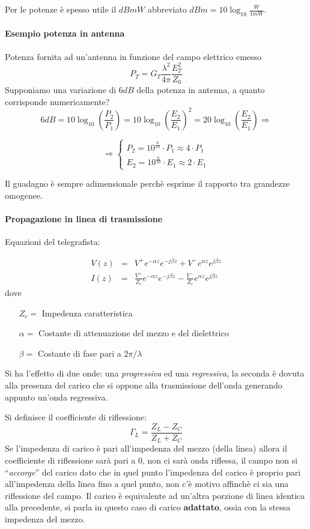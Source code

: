 Per le potenze è spesso utile il $\si{dB}mW $ abbreviato $\si{dB}m = 10\log_{10}\frac{W}{1 mW}$.

\paragraph{Esempio potenza in antenna}
Potenza fornita ad un'antenna in funzione del campo elettrico emesso
$$P_T = G_T \frac{\lambda^2}{4\pi}\frac{E_T^2}{Z_0}$$
Supponiamo una variazione di $6 \si{dB}$ della potenza in antenna, a quanto corrisponde numericamente?
$$6\si{dB} = 10\log_{10}\left(\frac{P_2}{P_1} \right) = 10\log_{10}\left(\frac{E_2}{E_1}\right)^2 =
20\log_{10}\left(\frac{E_2}{E_1}\right) \Rightarrow$$

$$\Rightarrow
\begin{cases}
 P_2 = 10^{\frac{6}{10}}\cdot P_1 \approx 4\cdot P_1 \\
 E_2 = 10^{\frac{6}{20}}\cdot E_1 \approx 2\cdot E_1
\end{cases}
$$

Il guadagno è sempre adimensionale perchè esprime il rapporto tra grandezze omogenee.

\paragraph{Propagazione in linea di trasmissione}
Equazioni del telegrafista:

\begin{eqnarray*}
 V(z) &=& V^+e^{-\alpha z} e^{-j\beta z} + V^-e^{\alpha z}e^{j\beta z}  \\
 I(z) &=& \frac{V^+}{Z_c}e^{-\alpha z} e^{-j\beta z} - \frac{V^-}{Z_c}e^{\alpha z}e^{j\beta z}
\end{eqnarray*}
dove
\begin{itemize}
 \item[$Z_c =$] Impedenza caratteristica
 \item[$\alpha =$] Costante di attenuazione del mezzo e del dielettrico
 \item[$\beta =$] Costante di fase pari a $2\pi/\lambda$
\end{itemize}


Si ha l'effetto di due onde: una \textit{progressiva} ed una \textit{regressiva}, la seconda è dovuta alla
presenza del carico che si oppone alla trasmissione dell'onda generando appunto un'onda regressiva.

Si definisce il coefficiente di riflessione:
$$ 
\Gamma_L = \frac{Z_L - Z_C}{Z_L + Z_C}
$$
Se l'impedenza di carico è pari all'impedenza del mezzo (della linea) allora il coefficiente di riflessione
sarà pari a 0, non ci sarà onda riflessa, il campo non si ``\textit{accorge}'' del carico dato che
in quel punto l'impedenza del carico è proprio pari all'impedenza della linea fino a quel punto, non c'è motivo affinchè
ci sia una riflessione del campo. Il carico è equivalente ad un'altra porzione di linea identica alla precedente, si
parla in questo caso di carico \textbf{adattato}, ossia con la stessa impedenza del mezzo.

